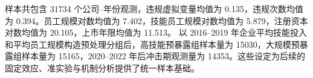 \noindent 样本共包含     31734 个公司--年份观测，违规虚拟变量均值为 0.135，违规次数均值为 0.394。员工规模对数均值为 7.402，技能员工规模对数均值为 5.879，注册资本对数均值为 20.105，上市年限均值为 11.513。
\noindent 以 2016--2019 年企业平均技能投入和平均员工规模构造预处理分组后，高技能预暴露组样本量为     15030，大规模预暴露组样本量为     15165，2020--2022 年后冲击期观测量为     14353。这些设定为后续的固定效应、准实验与机制分析提供了统一样本基础。
